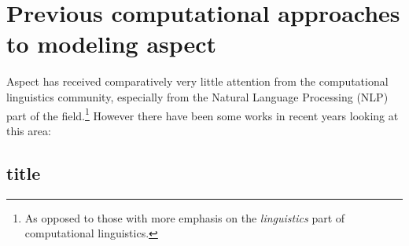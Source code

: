 
\section{Previous computational approaches to modeling aspect}
Aspect has received comparatively very little attention from the computational linguistics community\citep{friedrich-etal-2023-kind}, especially from the Natural Language Processing (NLP) part of the field.\footnote{As opposed to those with more emphasis on the \emph{linguistics} part of computational linguistics.} However there have been some works in recent years looking at this area:

\subsection*{title}
